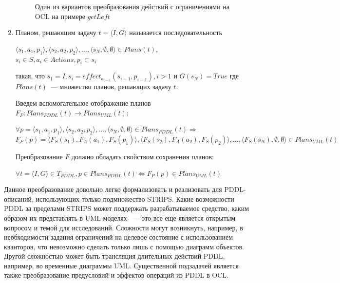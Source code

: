 \documentclass[a4paper,14pt]{extreport}
\begin{document}
\begin{enumerate}
\begin{figure}[h]
    \begin{center}
        \begin{minipage}{0.8\linewidth}
            \caption{Один из вариантов преобразования действий с ограничениями на OCL на примере $getLeft$ }
        \end{minipage}    
    \end{center}

    \label{img:property-actions}
\end{figure}      

    \item
        Планом, решающим задачу $t = \langle I, G \rangle$ называется последовательность 
        \begin{center}
            $\langle s_1, a_1, p_1  \rangle, \langle s_2, a_2, p_2  \rangle, ..., \langle s_N, \emptyset, \emptyset \rangle \in Plans(t)$, \\ $s_i \in S, a_i \in Actions, p_i \subset s_i$
        \end{center}
        такая, что $s_1 = I, s_i = effect_{a_{i-1}}(s_{i-1}, p_{i-1}), i > 1$ и $G(s_N) = True$ где $Plans(t)$~--- множество планов, решающих задачу $t$.
            
        Введем вспомогательное отображение планов $F_P: Plans_{PDDL}(t) \rightarrow Plans_{UML}(t)$:
            \begin{center}
                $\forall p = \langle s_1, a_1, p_1  \rangle, \langle s_2, a_2, p_2  \rangle, ..., \langle s_N, \emptyset, \emptyset  \rangle \in Plans_{PDDL}(t) \Rightarrow $\\
            $F_P(p) = \langle F_S(s_1), F_A(a_1), F_S(p_1)  \rangle, \langle F_S(s_2), F_A(a_2), F_S(p_2)  \rangle, ..., \langle F_S(s_N), \emptyset, \emptyset  \rangle \in Plans_{UML}(t) $  
            \end{center}
            
        Преобразование $F$ должно обладать свойством сохранения планов:
        
        \begin{center}
            $\forall t = \langle I, G\rangle \in T_{PDDL}, p \in Plans_{PDDL}(t) 
            \Leftrightarrow F_P(p) \in Plans_{UML}(t) $

        \end{center}
    \end{enumerate}
    

    Данное преобразование довольно легко формализовать и реализовать для PDDL-описаний, использующих только подмножество STRIPS.
 Какие возможности PDDL за пределами STRIPS может поддержать разрабатываемое средство, каким образом их представлять в UML-моделях ~--- это все еще является открытым вопросом и темой для исследований.
 Сложности могут возникнуть, например, в необходимости задания ограничений на целевое состояние с использованием кванторов, что невозможно сделать только лишь с помощью диаграмм объектов.
 Другой сложностью может быть трансляция длительных действий PDDL, например, во временные диаграммы UML.
 Существенной подзадачей является также преобразование предусловий и эффектов операций из PDDL в OCL.
 
\end{document}

